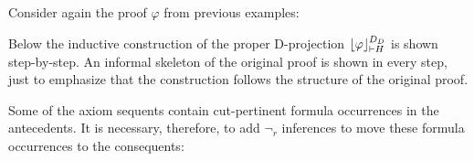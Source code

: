 \begin{example}
\label{example:DProjectionProper}


Consider again the proof $\varphi$ from previous examples:

\begin{prooftree}
		 
	 
						 
					 
					 
									 
								 
\end{prooftree}

Below the inductive construction of the proper D-projection $\projectionDDefinitional{\varphi}{ \seq H}$ is shown step-by-step. An informal skeleton of the original proof is shown in every step, just to emphasize that the construction follows the structure of the original proof.

\begin{prooftree}
		 
	 
						 
					 
					 
									 
								 
\end{prooftree}

Some of the axiom sequents contain cut-pertinent formula occurrences in the antecedents. It is necessary, therefore, to add $\neg_r$ inferences to move these formula occurrences to the consequents:


\end{example}

